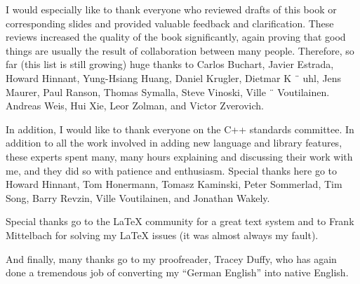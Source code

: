 I would especially like to thank everyone who reviewed drafts of this book or corresponding slides and provided valuable feedback and clarification. These reviews increased the quality of the book significantly, again proving that good things are usually the result of collaboration between many people. Therefore, so far (this list is still growing) huge thanks to Carlos Buchart, Javier Estrada, Howard Hinnant, Yung-Hsiang Huang, Daniel Krugler, Dietmar K ¨ uhl, Jens Maurer, Paul Ranson, Thomas Symalla, Steve Vinoski, Ville ¨ Voutilainen. Andreas Weis, Hui Xie, Leor Zolman, and Victor Zverovich.

In addition, I would like to thank everyone on the C++ standards committee. In addition to all the work involved in adding new language and library features, these experts spent many, many hours explaining and discussing their work with me, and they did so with patience and enthusiasm. Special thanks here go to Howard Hinnant, Tom Honermann, Tomasz Kaminski, Peter Sommerlad, Tim Song, Barry Revzin, Ville Voutilainen, and Jonathan Wakely.

Special thanks go to the LaTeX community for a great text system and to Frank Mittelbach for solving my \LaTeX{} issues (it was almost always my fault).

And finally, many thanks go to my proofreader, Tracey Duffy, who has again done a tremendous job of converting my “German English” into native English.


















